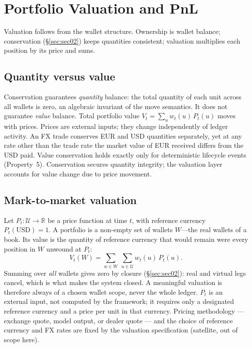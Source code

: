 \section{Portfolio Valuation and PnL}
\label{sec:sec05}\label{sec:valuation}

Valuation follows from the wallet structure. Ownership is wallet balance; conservation (\S\ref{sec:sec02}) keeps quantities consistent; valuation multiplies each position by its price and sums.

\subsection{Quantity versus value}

Conservation guarantees \emph{quantity} balance: the total quantity of each unit across all wallets is zero, an algebraic invariant of the move semantics. It does not guarantee \emph{value} balance. Total portfolio value $V_t = \sum_u w_t(u)\,P_t(u)$ moves with prices. Prices are external inputs; they change independently of ledger activity. An FX trade conserves EUR and USD quantities separately, yet at any rate other than the trade rate the market value of EUR received differs from the USD paid. Value conservation holds exactly only for deterministic lifecycle events (Property~5). Conservation secures quantity integrity; the valuation layer accounts for value change due to price movement.

\subsection{Mark-to-market valuation}

\begin{definition}
\label{def:portfolio-value}
Let $P_t : \mathcal{U} \to \mathbb{R}$ be a price function at time $t$, with reference currency $P_t(\mathrm{USD}) = 1$. A portfolio is a non-empty set of wallets $W$---the real wallets of a book. Its value is the quantity of reference currency that would remain were every position in $W$ unwound at $P_t$:
\[
V_t(W) = \sum_{w \in W}\ \sum_{u \in \mathcal{U}} w_t(u)\,P_t(u).
\]
Summing over \emph{all} wallets gives zero by closure (\S\ref{sec:sec02}): real and virtual legs cancel, which is what makes the system closed. A meaningful valuation is therefore always of a chosen wallet scope, never the whole ledger. $P_t$ is an external input, not computed by the framework; it requires only a designated reference currency and a price per unit in that currency. Pricing methodology --- exchange quote, model output, or dealer quote --- and the choice of reference currency and FX rates are fixed by the valuation specification (satellite, out of scope here).
\end{definition}

